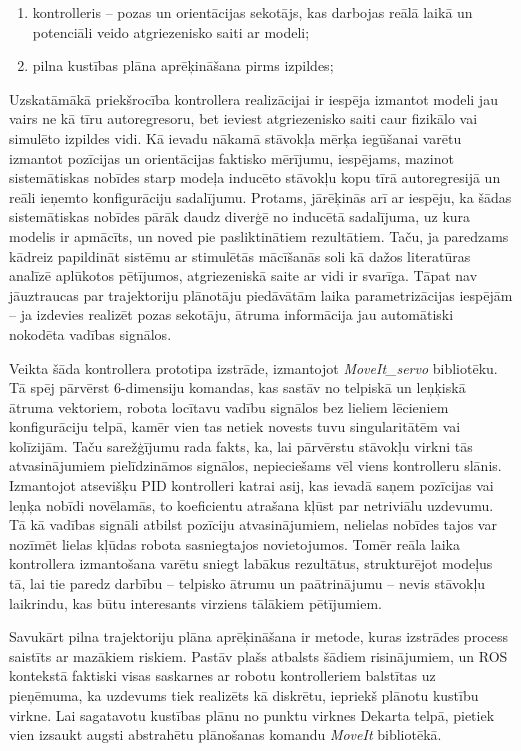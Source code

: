 \documentclass[12pt, a4paper]{article}
\numberwithin{equation}{section} %
\begin{document}
\begin{enumerate}
    \item kontrolleris -- pozas un orientācijas sekotājs, kas darbojas reālā laikā un potenciāli veido atgriezenisko saiti ar modeli;
    \item pilna kustības plāna aprēķināšana pirms izpildes;
\end{enumerate}

Uzskatāmākā priekšrocība kontrollera realizācijai ir iespēja izmantot modeli jau vairs ne kā tīru autoregresoru, bet ieviest atgriezenisko saiti caur fizikālo vai simulēto izpildes vidi. Kā ievadu nākamā stāvokļa mērķa iegūšanai varētu izmantot pozīcijas un orientācijas faktisko mērījumu, iespējams, mazinot sistemātiskas nobīdes starp modeļa inducēto stāvokļu kopu tīrā autoregresijā un reāli ieņemto konfigurāciju sadalījumu. Protams, jārēķinās arī ar iespēju, ka šādas sistemātiskas nobīdes pārāk daudz diverģē no inducētā sadalījuma, uz kura modelis ir apmācīts, un noved pie pasliktinātiem rezultātiem. Taču, ja paredzams kādreiz papildināt sistēmu ar stimulētās mācīšanās soli kā dažos literatūras analīzē aplūkotos pētījumos, atgriezeniskā saite ar vidi ir svarīga. Tāpat nav jāuztraucas par trajektoriju plānotāju piedāvātām laika parametrizācijas iespējām -- ja izdevies realizēt pozas sekotāju, ātruma informācija jau automātiski nokodēta vadības signālos.

Veikta šāda kontrollera prototipa izstrāde, izmantojot \textit{MoveIt\_servo} bibliotēku. Tā spēj pārvērst 6-dimensiju komandas, kas sastāv no telpiskā un leņķiskā ātruma vektoriem, robota locītavu vadību signālos bez lieliem lēcieniem konfigurāciju telpā, kamēr vien tas netiek novests tuvu singularitātēm vai kolīzijām. Taču sarežģījumu rada fakts, ka, lai pārvērstu stāvokļu virkni tās atvasinājumiem pielīdzināmos signālos, nepieciešams vēl viens kontrolleru slānis. Izmantojot atsevišķu PID kontrolleri katrai asij, kas ievadā saņem pozīcijas vai leņķa nobīdi novēlamās, to koeficientu atrašana kļūst par netriviālu uzdevumu. Tā kā vadības signāli atbilst pozīciju atvasinājumiem, nelielas nobīdes tajos var nozīmēt lielas kļūdas robota sasniegtajos novietojumos. Tomēr reāla laika kontrollera izmantošana varētu sniegt labākus rezultātus, strukturējot modeļus tā, lai tie paredz darbību -- telpisko ātrumu un paātrinājumu -- nevis stāvokļu laikrindu, kas būtu interesants virziens tālākiem pētījumiem.

Savukārt pilna trajektoriju plāna aprēķināšana ir metode, kuras izstrādes process saistīts ar mazākiem riskiem. Pastāv plašs atbalsts šādiem risinājumiem, un ROS kontekstā faktiski visas saskarnes ar robotu kontrolleriem balstītas uz pieņēmuma, ka uzdevums tiek realizēts kā diskrētu, iepriekš plānotu kustību virkne. Lai sagatavotu kustības plānu no punktu virknes Dekarta telpā, pietiek vien izsaukt augsti abstrahētu plānošanas komandu \textit{MoveIt} bibliotēkā. 
\end{document}
